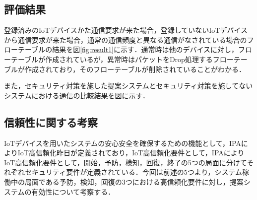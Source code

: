 \documentclass[Japanese]{dicomopapers}
\begin{document}


\subsection{評価結果}
登録済みのIoTデバイスかた通信要求が来た場合，登録していないIoTデバイスから通信要求が来た場合，通常の通信頻度と異なる通信がなされている場合のフローテーブルの結果を図\ref{fig:result1}に示す．通常時は他のデバイスに対し，フローテーブルが作成されているが，異常時はパケットをDrop処理するフローテーブルが作成されており，そのフローテーブルが削除されていることがわかる．\par
また，セキュリティ対策を施した提案システムとセキュリティ対策を施してないシステムにおける通信の比較結果を図に示す．

\subsection{信頼性に関する考察}
IoTデバイスを用いたシステムの安心安全を確保するための機能として，IPAによりIoT高信頼化昨日が定義されており，IoT高信頼化要件として，IPAによりIoT高信頼化要件として，開始，予防，検知，回復，終了の5つの局面に分けてそれぞれセキュリティ要件が定義されている\cite{IPA}．今回は前述の5つより，システム稼働中の局面である予防，検知，回復の3つにおける高信頼化要件に対し，提案システムの有効性について考察する．
\end{document}
